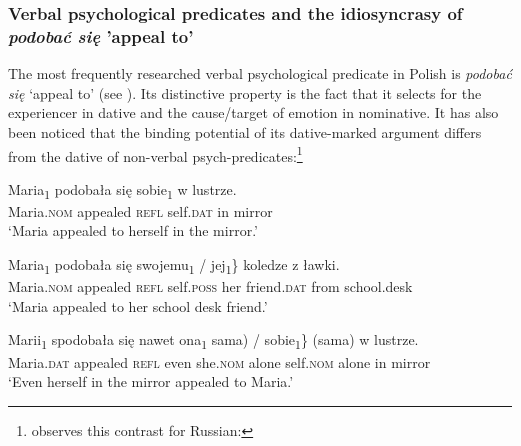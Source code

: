 \documentclass[output=paper,modfonts,nonflat
]{langsci/langscibook}
\begin{document}
\subsubsection{Verbal psychological predicates and the idiosyncrasy of \textit{podobać się} ’appeal to’} \label{s3.2.2}

The most frequently researched verbal psychological predicate in Polish is \textit{podobać się} ‘appeal to’ (see \citealt{miechowicz2008,bondaruk2007,zychlinski2013,jimenezfernandez2016,bondaruketal2017}). Its distinctive property is the fact that it selects for the experiencer in dative and the cause/target of emotion in nominative. It has also been noticed that the binding potential of its dative-marked argument differs from the dative of non-verbal psych-predicates:\footnote{\label{fn23}\cite[253]{franks1995} observes this contrast for Russian:
\z
{}
\z
{}
\z}

\ea \label{ex:witkos:41}
\gll Maria\textsubscript{1} podobała się sobie\textsubscript{1} w lustrze.\\
 Maria.\textsc{nom} appealed \textsc{refl} self.\textsc{dat} in mirror\\
\glt `Maria appealed to herself in the mirror.'
\z

\ea \label{ex:witkos:42}
\gll Maria\textsubscript{1} podobała się \minsp{\{} swojemu\textsubscript{1} / \minsp{*} jej\textsubscript{1}\} koledze z ławki.\\
 Maria.\textsc{nom} appealed \textsc{refl} {} self.\textsc{poss} {} {} her friend.\textsc{dat} from school.desk\\
\glt `Maria appealed to her school desk friend.'
\z

\ea \label{ex:witkos:43}
\gll Marii\textsubscript{1} spodobała się nawet  ona\textsubscript{1} \minsp{\{(} sama) / \minsp{*} sobie\textsubscript{1}\} (sama) w lustrze.\\
     Maria.\textsc{dat} appealed \textsc{refl} even {} she.\textsc{nom} {} alone {} {} self.\textsc{nom} alone in mirror\\
\glt `Even herself in the mirror appealed to Maria.'
\z
\end{document}
